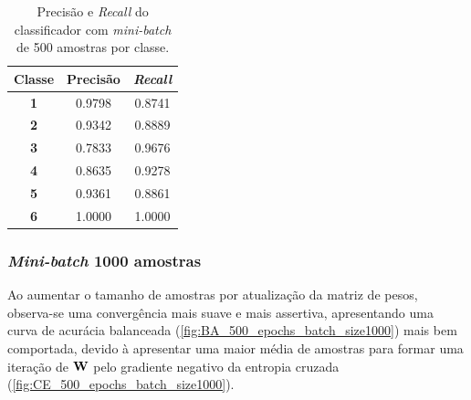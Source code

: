 \begin{table}[H]
	\centering
	\begin{tabular}{c|c|c}
		\textbf{Classe} & \textbf{Precisão} & \textit{\textbf{Recall}} \\ \hline
		\textbf{1}      & 0.9798            & 0.8741                   \\
		\textbf{2}      & 0.9342            & 0.8889                   \\
		\textbf{3}      & 0.7833            & 0.9676                   \\
		\textbf{4}      & 0.8635            & 0.9278                   \\
		\textbf{5}      & 0.9361            & 0.8861                   \\
		\textbf{6}      & 1.0000            & 1.0000                  
	\end{tabular}
	\caption{Precisão e \textit{Recall} do classificador com \textit{mini-batch} de 500 amostras por classe.}
	\label{tab:pr_lr_500}
\end{table}



\subsubsection*{\textit{Mini-batch} 1000 amostras}

Ao aumentar o tamanho de amostras por atualização da matriz de pesos, observa-se uma convergência mais suave e mais assertiva, apresentando uma curva de acurácia balanceada (\autoref{fig:BA_500_epochs_batch_size1000}) mais bem comportada, devido à apresentar uma maior média de amostras para formar uma iteração de $\mathbf{W}$ pelo gradiente negativo da entropia cruzada (\autoref{fig:CE_500_epochs_batch_size1000}).

